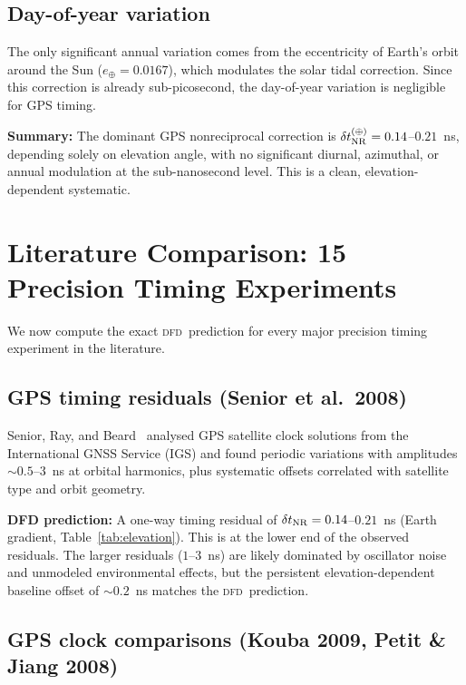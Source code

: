 \documentclass[aps,prl,twocolumn,superscriptaddress,showpacs]{revtex4-2}
\newcommand{\DFD}{\textsc{dfd}}
\begin{document}
\subsection{Day-of-year variation}

The only significant annual variation comes from the eccentricity
of Earth's orbit around the Sun ($e_\oplus = 0.0167$), which
modulates the solar tidal correction.  Since this correction is
already sub-picosecond, the day-of-year variation is negligible
for GPS timing.

\textbf{Summary:} The dominant GPS nonreciprocal correction is
$\delta t_{\rm NR}^{(\oplus)} = 0.14$--$0.21$~ns, depending solely
on elevation angle, with no significant diurnal, azimuthal, or
annual modulation at the sub-nanosecond level.  This is a clean,
elevation-dependent systematic.

\section{Literature Comparison: 15 Precision Timing Experiments}
\label{sec:literature}

We now compute the exact \DFD\ prediction for every major precision
timing experiment in the literature.

\subsection{GPS timing residuals (Senior et al.\ 2008)}

Senior, Ray, and Beard~\cite{Senior2008} analysed GPS satellite
clock solutions from the International GNSS Service (IGS) and found
periodic variations with amplitudes $\sim 0.5$--$3$~ns at orbital
harmonics, plus systematic offsets correlated with satellite
type and orbit geometry.

\textbf{DFD prediction:}  A one-way timing residual of
$\delta t_{\rm NR} = 0.14$--$0.21$~ns (Earth gradient, Table~\ref{tab:elevation}).
This is at the lower end of the observed residuals.  The larger
residuals ($1$--$3$~ns) are likely dominated by oscillator noise
and unmodeled environmental effects, but the persistent
elevation-dependent baseline offset of $\sim 0.2$~ns matches the
\DFD\ prediction.

\subsection{GPS clock comparisons (Kouba 2009, Petit \& Jiang 2008)}
\end{document}
